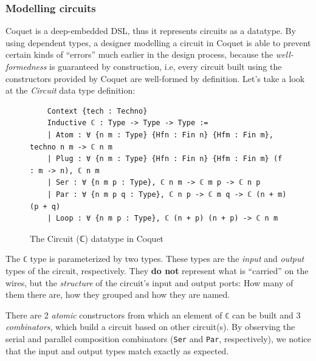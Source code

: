 \documentclass[a4paper]{article}
\begin{document}
            \subsubsection{Modelling circuits}
            \label{subsubsec:coquet-modelling}
                Coquet is a deep-embedded DSL, thus it represents circuits as a datatype. By using
                dependent types, a designer modelling a circuit in Coquet is able to prevent certain
                kinds of ``errors'' much earlier in the design process, because the
                \emph{well-formedness} is guaranteed by construction, i.e, every circuit built using
                the constructors provided by Coquet are well-formed by definition. Let's take a look
                at the \emph{Circuit} data type definition:
                \begin{figure}[h]
                    \begin{center}
                        \begin{verbatim}
    Context {tech : Techno}
    Inductive ℂ : Type -> Type -> Type :=
    | Atom : ∀ {n m : Type} {Hfn : Fin n} {Hfm : Fin m}, techno n m -> ℂ n m
    | Plug : ∀ {n m : Type} {Hfn : Fin n} {Hfm : Fin m} (f : m -> n), ℂ n m
    | Ser : ∀ {n m p : Type}, ℂ n m -> ℂ m p -> ℂ n p
    | Par : ∀ {n m p q : Type}, ℂ n p -> ℂ m q -> ℂ (n + m) (p + q)
    | Loop : ∀ {n m p : Type}, ℂ (n + p) (n + p) -> ℂ n m
                        \end{verbatim}
                    \end{center}
                    \caption{The Circuit (ℂ) datatype in Coquet
                        \label{fig:coquet-circuit-type}}
                \end{figure}

                The \texttt{ℂ} type is parameterized by two types. These types are the \emph{input} and
                \emph{output} types of the circuit, respectively. They \textbf{do not} represent
                what is ``carried'' on the wires, but the \emph{structure} of the circuit's input
                and output ports: How many of them there are, how they grouped and how they are
                named.

                There are 2 \emph{atomic} constructors from which an element of \texttt{ℂ} can be
                built and 3 \emph{combinators}, which build a circuit based on other circuit(s). By
                observing the serial and parallel composition combinators (\texttt{Ser} and
                \texttt{Par}, respectively), we notice that the input and output types match exactly
                as expected.
\end{document}
